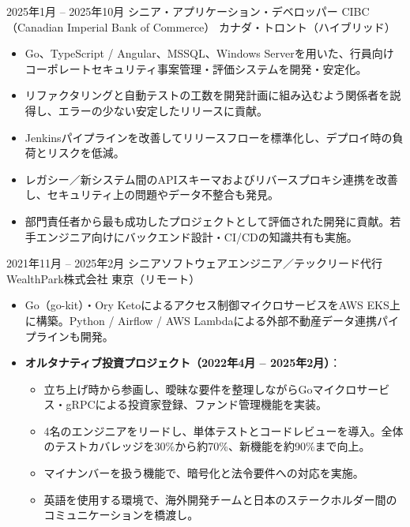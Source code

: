 \documentclass[10pt,a4paper]{moderncv}
\begin{document}
\cventry
    {2025年1月 -- 2025年10月}
    {シニア・アプリケーション・デベロッパー}
    {CIBC（Canadian Imperial Bank of Commerce）}
    {カナダ・トロント（ハイブリッド）}
    {}
    {
      \begin{itemize}
        \item Go、TypeScript / Angular、MSSQL、Windows Serverを用いた、行員向けコーポレートセキュリティ事案管理・評価システムを開発・安定化。
        \item リファクタリングと自動テストの工数を開発計画に組み込むよう関係者を説得し、エラーの少ない安定したリリースに貢献。
        \item Jenkinsパイプラインを改善してリリースフローを標準化し、デプロイ時の負荷とリスクを低減。
        \item レガシー／新システム間のAPIスキーマおよびリバースプロキシ連携を改善し、セキュリティ上の問題やデータ不整合も発見。
        \item 部門責任者から最も成功したプロジェクトとして評価された開発に貢献。若手エンジニア向けにバックエンド設計・CI/CDの知識共有も実施。
      \end{itemize}
    }

\cventry
    {2021年11月 -- 2025年2月}
    {シニアソフトウェアエンジニア／テックリード代行}
    {WealthPark株式会社}
    {東京（リモート）}
    {}
    {
      \begin{itemize}
        \item Go（go-kit）・Ory Ketoによるアクセス制御マイクロサービスをAWS EKS上に構築。Python / Airflow / AWS Lambdaによる外部不動産データ連携パイプラインも開発。
        \item \textbf{オルタナティブ投資プロジェクト（2022年4月 -- 2025年2月）}：
        \begin{itemize}
          \item 立ち上げ時から参画し、曖昧な要件を整理しながらGoマイクロサービス・gRPCによる投資家登録、ファンド管理機能を実装。
          \item 4名のエンジニアをリードし、単体テストとコードレビューを導入。全体のテストカバレッジを30\%から約70\%、新機能を約90\%まで向上。
          \item マイナンバーを扱う機能で、暗号化と法令要件への対応を実施。
          \item 英語を使用する環境で、海外開発チームと日本のステークホルダー間のコミュニケーションを橋渡し。
        \end{itemize}
      \end{itemize}
    }
\end{document}
